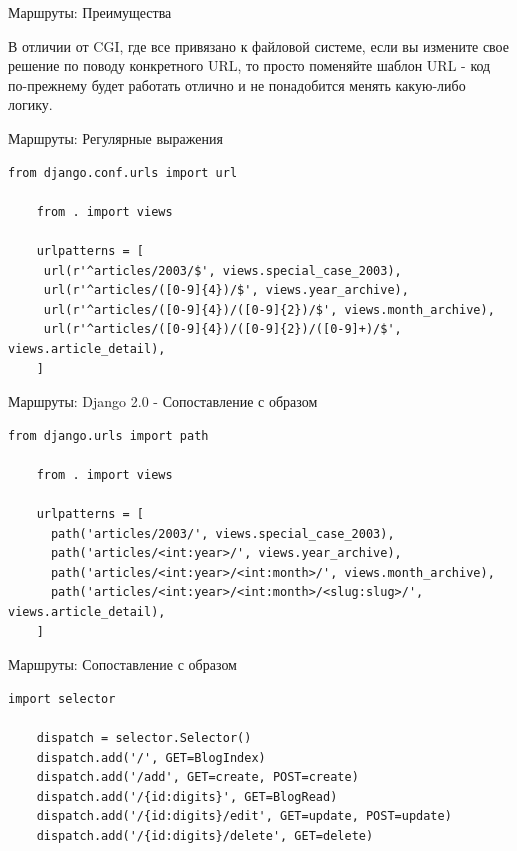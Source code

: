 \begin{frame}{Маршруты: Преимущества}

  В отличии от CGI, где все привязано к файловой системе,
  если вы измените свое решение по поводу конкретного URL, то просто поменяйте
  шаблон URL - код по-прежнему будет работать отлично и не понадобится менять
  какую-либо логику.

\end{frame}

\begin{frame}[fragile]{Маршруты: Регулярные выражения}

  \begin{lstlisting}[style=python]
    from django.conf.urls import url

    from . import views

    urlpatterns = [
     url(r'^articles/2003/$', views.special_case_2003),
     url(r'^articles/([0-9]{4})/$', views.year_archive),
     url(r'^articles/([0-9]{4})/([0-9]{2})/$', views.month_archive),
     url(r'^articles/([0-9]{4})/([0-9]{2})/([0-9]+)/$', views.article_detail),
    ]
    \end{lstlisting}

\end{frame}

\begin{frame}[fragile]{Маршруты: Django 2.0 - Сопоставление с образом}

  \begin{lstlisting}[style=python]
    from django.urls import path

    from . import views

    urlpatterns = [
      path('articles/2003/', views.special_case_2003),
      path('articles/<int:year>/', views.year_archive),
      path('articles/<int:year>/<int:month>/', views.month_archive),
      path('articles/<int:year>/<int:month>/<slug:slug>/', views.article_detail),
    ]
    \end{lstlisting}

\end{frame}

\begin{frame}[fragile]{Маршруты: Сопоставление с образом}

  \begin{lstlisting}[style=python]
    import selector

    dispatch = selector.Selector()
    dispatch.add('/', GET=BlogIndex)
    dispatch.add('/add', GET=create, POST=create)
    dispatch.add('/{id:digits}', GET=BlogRead)
    dispatch.add('/{id:digits}/edit', GET=update, POST=update)
    dispatch.add('/{id:digits}/delete', GET=delete)
  \end{lstlisting}

\end{frame}





